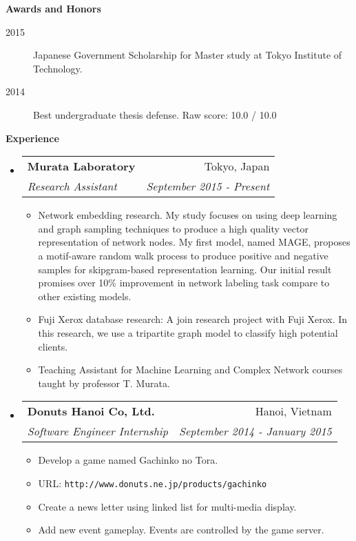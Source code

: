 \documentclass[letter,11pt]{article}
\makeatletter
\newcommand{\resitem}[1]{\item #1 \vspace{-2pt}}
\newcommand{\resheading}[1]{{\large \colorbox{mygrey}{\begin{minipage}{\textwidth}{\textbf{#1 \vphantom{p\^{E}}}}\end{minipage}}}}
\newcommand{\ressubheading}[4]{
\begin{tabular*}{6.5in}{l@{\extracolsep{\fill}}r}
		\textbf{#1} & #2 \\
		\textit{#3} & \textit{#4} \\
\end{tabular*}\vspace{-6pt}}
\makeatother
\begin{document}
\resheading{Awards and Honors}
	\begin{description}
		\resitem[2015] Japanese Government Scholarship for Master study at Tokyo Institute of Technology.
		\resitem[2014] Best undergraduate thesis defense. Raw score: 10.0 / 10.0
    \end{description}

\resheading{Experience}
\begin{itemize}
\item
    \ressubheading{Murata Laboratory}{Tokyo, Japan}{Research Assistant}{September 2015 - Present}
    \begin{itemize}
        \resitem{Network embedding research. My study focuses on using deep learning and graph sampling techniques to produce a high quality vector representation of network nodes. My first model, named MAGE, proposes a motif-aware random walk process to produce positive and negative samples for skipgram-based representation learning. Our initial result promises over 10\% improvement in network labeling task compare to other existing models.}
        \resitem{Fuji Xerox database research: A join research project with Fuji Xerox. In this research, we use a tripartite graph model to classify high potential clients.}
        \resitem{Teaching Assistant for Machine Learning and Complex Network courses taught by professor T. Murata.}
    \end{itemize}
\item
    \ressubheading{Donuts Hanoi Co, Ltd.}{Hanoi, Vietnam}{Software Engineer Internship}{September 2014 - January 2015}
    \begin{itemize}
        \resitem{Develop a game named Gachinko no Tora.}
        \resitem{URL: \texttt{http://www.donuts.ne.jp/products/gachinko}}
        \resitem{Create a news letter using linked list for multi-media display.}
        \resitem{Add new event gameplay. Events are controlled by the game server.}

\end{itemize}
\end{itemize}
\end{document}
